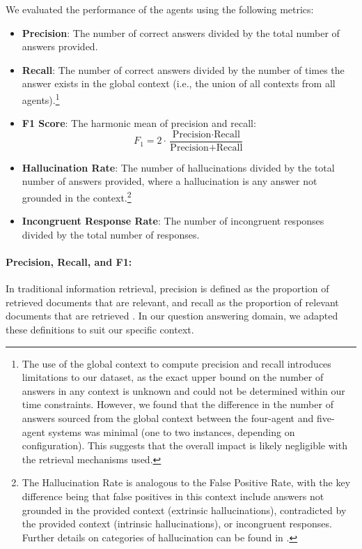 \documentclass[sigconf,nonacm]{acmart}
\begin{document}
We evaluated the performance of the agents using the following metrics:

\begin{itemize}
    \item \textbf{Precision}: The number of correct answers divided by the total number of answers provided.
    \item \textbf{Recall}: The number of correct answers divided by the number of times the answer exists in the global context (i.e., the union of all contexts from all agents).\footnote{The use of the global context to compute precision and recall introduces limitations to our dataset, as the exact upper bound on the number of answers in any context is unknown and could not be determined within our time constraints. However, we found that the difference in the number of answers sourced from the global context between the four-agent and five-agent systems was minimal (one to two instances, depending on configuration). This suggests that the overall impact is likely negligible with the retrieval mechanisms used.}
    \item \textbf{F1 Score}: The harmonic mean of precision and recall:
    \[
    F_1 = 2 \cdot \frac{\text{Precision} \cdot \text{Recall}}{\text{Precision} + \text{Recall}}
    \]
    \item \textbf{Hallucination Rate}: The number of hallucinations divided by the total number of answers provided, where a hallucination is any answer not grounded in the context.\footnote{The Hallucination Rate is analogous to the False Positive Rate, with the key difference being that false positives in this context include answers not grounded in the provided context (extrinsic hallucinations), contradicted by the provided context (intrinsic hallucinations), or incongruent responses. Further details on categories of hallucination can be found in \cite{survey_hallucination}.}
    \item \textbf{Incongruent Response Rate}: The number of incongruent responses divided by the total number of responses.
\end{itemize}

\paragraph{Precision, Recall, and F1:} In traditional information retrieval, precision is defined as the proportion of retrieved documents that are relevant, and recall as the proportion of relevant documents that are retrieved \cite{Manning2008}. In our question answering domain, we adapted these definitions to suit our specific context.
\end{document}
